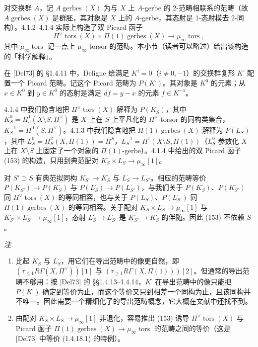 
 对交换群 $A$，记 $A\operatorname{gerbes}(X)$ 为与 $X$ 上 $A$-gerbe 的 2-范畴相联系的范畴（故 $A\operatorname{gerbes}(X)$ 是群胚，其对象是 $X$ 上的 $A$-gerbe，其态射是 1-态射模去 2-同构）。4.1.2–4.1.4 实际上构造了双 Picard 函子
\begin{equation}\tag{153}
\Pi^{\vee}\operatorname{tors}(X)\times\Pi(1)\operatorname{gerbes}(X)\to\mu_\infty\operatorname{tors},
\end{equation}
其中 $\mu_\infty\operatorname{tors}$ 记一点上 $\mu_\infty$-torsor 的范畴。本小节（读者可以略过）给出该构造的「科学解释」。

在 [Del73] 的 §1.4.11 中，Deligne 给满足 $K^i=0$（$i\ne 0,-1$）的交换群复形 $K^{\cdot}$ 配置一个 Picard 范畴。记这个 Picard 范畴为 $P(K^{\cdot})$。其对象是 $K^0$ 的元素；从 $x\in K^0$ 到 $y\in K^0$ 的态射是满足 $df=y-x$ 的元素 $f\in K^{-1}$。

4.1.4 中我们隐含地把 $\Pi^{\vee}\operatorname{tors}(X)$ 解释为 $P(K^{\cdot}_S)$，其中 $K^0_S=H^1_c(X\setminus S,\Pi^{\vee})$ 是 $X$ 上在 $S$ 上平凡化的 $\Pi^{\vee}$-torsor 的同构类集合，$K^{-1}_S=H^0(S,\Pi^{\vee})$。4.1.3 中我们隐含地把 $\Pi(1)\operatorname{gerbes}(X)$ 解释为 $P(L^{\cdot}_S)$，其中 $L^0_S=H^2_S(X,\Pi(1))=\Pi^S$，$L^{-1}_S=H^1(X\setminus S,\Pi(1))$（$L^0_S$ 参数化 $X$ 上在 $X\setminus S$ 上固定了一个对象的 $\Pi(1)$-gerbe）。4.1.4 中给出的双 Picard 函子 (153) 的构造，只用到典范配对 $K^{\cdot}_S\times L^{\cdot}_S\to\mu_\infty[1]$。

对 $S'\supset S$ 有典范拟同构 $K^{\cdot}_{S'}\to K^{\cdot}_S$ 与 $L^{\cdot}_S\to L^{\cdot}_{S'}$。相应的范畴等价 $P(K^{\cdot}_{S'})\to P(K^{\cdot}_S)$ 与 $P(L^{\cdot}_S)\to P(L^{\cdot}_{S'})$，与我们关于 $P(K^{\cdot}_S)$、$P(K^{\cdot}_{S'})$ 同 $\Pi^{\vee}\operatorname{tors}(X)$ 的等同相容，也与关于 $P(L^{\cdot}_S)$、$P(L^{\cdot}_{S'})$ 同 $\Pi(1)\operatorname{gerbes}(X)$ 的等同相容。关于配对 $K^{\cdot}_S\times L^{\cdot}_S\to\mu_\infty[1]$ 与 $K^{\cdot}_{S'}\times L^{\cdot}_{S'}\to\mu_\infty[1]$，态射 $L^{\cdot}_S\to L^{\cdot}_{S'}$ 是 $K^{\cdot}_{S'}\to K^{\cdot}_S$ 的伴随。因此 (153) 不依赖 $S$。

\emph{注.}
\begin{enumerate}[label=(\roman*),leftmargin=2.2em]
\item 比起 $K^{\cdot}_S$ 与 $L^{\cdot}_S$，用它们在导出范畴中的像更自然，即 $(\tau_{\le 1}R\Gamma(X,\Pi^{\vee}))[1]$ 与 $(\tau_{\ge 1}R\Gamma(X,\Pi(1)))[2]$。但通常的导出范畴不够用：按 [Del73] 的 §§1.4.13–1.4.14，$K^{\cdot}$ 在导出范畴中的像只能把 $P(K^{\cdot})$ 确定到等价为止，而这个等价又只到相差一个同构为止，且该同构并不唯一。因此需要一个精细化了的导出范畴概念，它大概在文献中还找不到。
\item 由配对 $K^{\cdot}_S\times L^{\cdot}_S\to\mu_\infty[1]$ 非退化，容易推出 (153) 诱导 $\Pi^{\vee}\operatorname{tors}(X)$ 与 Picard 函子 $\Pi(1)\operatorname{gerbes}(X)\to\mu_\infty\operatorname{tors}$ 的范畴之间的等价（这是 [Del73] 中等价 (1.4.18.1) 的特例）。
\end{enumerate}

